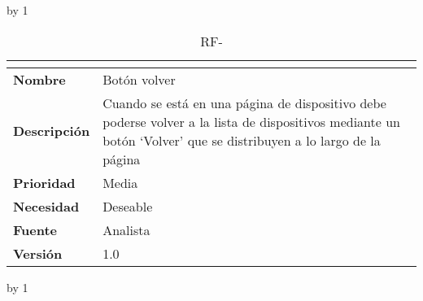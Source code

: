 \advance\rf by 1
\begin{table}[H]
	\caption{RF-\number\rf}
	\begin{tabular}{|l|p{}|}
		\hline
		\multicolumn{2}{|c|}{\cellcolor[HTML]{BFBFBF}{\color[HTML]{000000} \textbf{RF-\number\rf}}} \\ \hline
		\textbf{Nombre}      & Botón volver                                                                                                                                                     \\ \hline
		\textbf{Descripción} & Cuando se está en una página de dispositivo debe poderse volver a la lista de dispositivos mediante un botón ‘Volver’ que se distribuyen a lo largo de la página \\ \hline
		\textbf{Prioridad}   & Media                                                                                                                                                            \\ \hline
		\textbf{Necesidad}   & Deseable                                                                                                                                                         \\ \hline
		\textbf{Fuente}      & Analista                                                                                                                                                         \\ \hline
		\textbf{Versión}     & 1.0                                                                                                                                                              \\ \hline
	\end{tabular}
\end{table}
\advance\rf by 1
